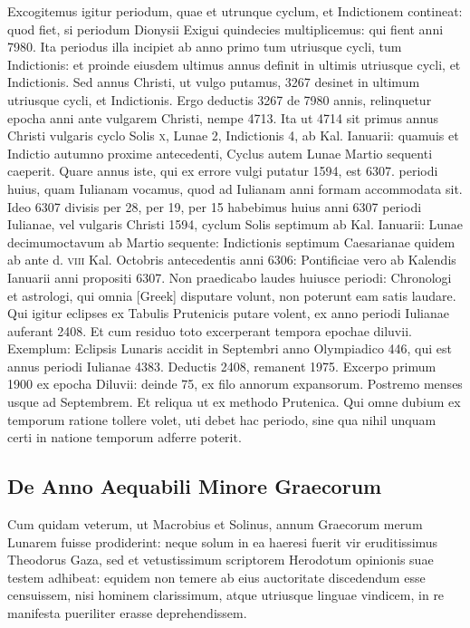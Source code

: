 Excogitemus igitur periodum,
quae et utrunque cyclum, et Indictionem contineat: quod fiet, si periodum
Dionysii Exigui quindecies multiplicemus: qui fient anni
7980.
Ita periodus illa incipiet ab anno primo tum utriusque cycli,
tum Indictionis: et proinde eiusdem ultimus annus definit in ultimis
utriusque cycli, et Indictionis.
Sed annus Christi, ut vulgo putamus,
3267 desinet in ultimum utriusque cycli, et Indictionis.
Ergo deductis
3267 de 7980 annis, relinquetur epocha anni ante vulgarem
Christi, nempe 4713.
Ita ut 4714 sit primus annus Christi vulgaris cyclo
Solis \textsc{x}, Lunae 2, Indictionis 4, ab Kal. Ianuarii: quamuis et Indictio
autumno proxime antecedenti, Cyclus autem Lunae Martio sequenti
caeperit.
Quare annus iste, qui ex errore vulgi putatur 1594, est 6307.
periodi huius, quam Iulianam vocamus, quod ad Iulianam anni formam
accommodata sit.
Ideo 6307 divisis per 28, per 19, per 15 habebimus
huius anni 6307 periodi Iulianae, vel vulgaris Christi 1594, cyclum
Solis septimum ab Kal. Ianuarii:
Lunae decimumoctavum ab
Martio sequente:
Indictionis septimum Caesarianae quidem ab ante d.
\textsc{viii} Kal. Octobris antecedentis anni 6306:
Pontificiae vero ab Kalendis
Ianuarii anni propositi 6307.
Non praedicabo laudes huiusce periodi:
Chronologi et astrologi, qui omnia \textgreek{[Greek]} disputare volunt,
non poterunt eam satis laudare.
Qui igitur eclipses ex Tabulis
Prutenicis putare volent, ex anno periodi Iulianae auferant 2408.
Et
cum residuo toto excerperant tempora epochae diluvii.
Exemplum: Eclipsis
Lunaris accidit in Septembri anno Olympiadico 446, qui est annus
periodi Iulianae 4383.
Deductis 2408, remanent 1975.
Excerpo
primum 1900 ex epocha Diluvii: deinde 75, ex filo annorum expansorum.
Postremo menses usque ad Septembrem.
Et reliqua ut ex methodo
Prutenica.
Qui omne dubium ex temporum ratione tollere
volet, uti debet hac periodo, sine qua nihil unquam certi in natione
temporum adferre poterit.

\subsection{De Anno Aequabili Minore Graecorum}
Cum quidam veterum, ut Macrobius et Solinus, annum Graecorum
merum Lunarem fuisse prodiderint:
neque solum in ea
haeresi fuerit vir eruditissimus Theodorus Gaza, sed et vetustissimum
scriptorem Herodotum opinionis suae testem adhibeat:
equidem non
temere ab eius auctoritate discedendum esse censuissem, nisi hominem
clarissimum, atque utriusque linguae vindicem, in re manifesta
pueriliter erasse deprehendissem.

